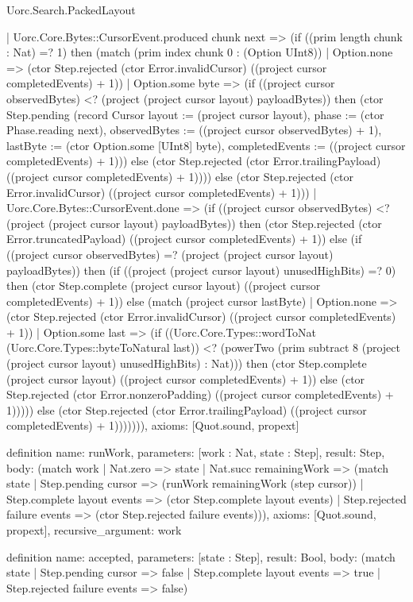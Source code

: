 \begin{lexlean}{Uorc.Search.PackedLayout}
\begin{semanticmodule}
{        | Uorc.Core.Bytes::CursorEvent.produced chunk next => (if ((prim length chunk : Nat) =? 1) then (match (prim index chunk 0 : (Option UInt8))
          | Option.none => (ctor Step.rejected (ctor Error.invalidCursor) ((project cursor completedEvents) + 1))
          | Option.some byte => (if ((project cursor observedBytes) <? (project (project cursor layout) payloadBytes)) then (ctor Step.pending (record Cursor {layout := (project cursor layout), phase := (ctor Phase.reading next), observedBytes := ((project cursor observedBytes) + 1), lastByte := (ctor Option.some [UInt8] byte), completedEvents := ((project cursor completedEvents) + 1)})) else (ctor Step.rejected (ctor Error.trailingPayload) ((project cursor completedEvents) + 1)))) else (ctor Step.rejected (ctor Error.invalidCursor) ((project cursor completedEvents) + 1)))
        | Uorc.Core.Bytes::CursorEvent.done => (if ((project cursor observedBytes) <? (project (project cursor layout) payloadBytes)) then (ctor Step.rejected (ctor Error.truncatedPayload) ((project cursor completedEvents) + 1)) else (if ((project cursor observedBytes) =? (project (project cursor layout) payloadBytes)) then (if ((project (project cursor layout) unusedHighBits) =? 0) then (ctor Step.complete (project cursor layout) ((project cursor completedEvents) + 1)) else (match (project cursor lastByte)
          | Option.none => (ctor Step.rejected (ctor Error.invalidCursor) ((project cursor completedEvents) + 1))
          | Option.some last => (if ((Uorc.Core.Types::wordToNat (Uorc.Core.Types::byteToNatural last)) <? (powerTwo (prim subtract 8 (project (project cursor layout) unusedHighBits) : Nat))) then (ctor Step.complete (project cursor layout) ((project cursor completedEvents) + 1)) else (ctor Step.rejected (ctor Error.nonzeroPadding) ((project cursor completedEvents) + 1))))) else (ctor Step.rejected (ctor Error.trailingPayload) ((project cursor completedEvents) + 1))))))),
  axioms: [Quot.sound, propext]
}

definition{
  name: runWork,
  parameters: [work : Nat, state : Step],
  result: Step,
  body: (match work
    | Nat.zero => state
    | Nat.succ remainingWork => (match state
      | Step.pending cursor => (runWork remainingWork (step cursor))
      | Step.complete layout events => (ctor Step.complete layout events)
      | Step.rejected failure events => (ctor Step.rejected failure events))),
  axioms: [Quot.sound, propext],
  recursive_argument: work
}

definition{
  name: accepted,
  parameters: [state : Step],
  result: Bool,
  body: (match state
    | Step.pending cursor => false
    | Step.complete layout events => true
    | Step.rejected failure events => false)
}


\end{semanticmodule}
\end{lexlean}
